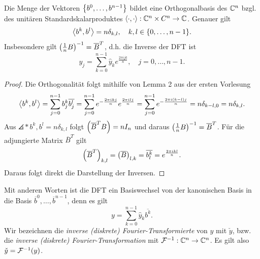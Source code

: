 \documentclass{lecture}
\begin{document}
    \begin{theorem}
        Die Menge der Vektoren \(\braces*{b^0, \ldots, b^{n - 1}}\) bildet eine Orthogonalbasis des \(\C^n\) bzgl. des unitären Standardskalarproduktes \(\angles*{\cdot, \cdot}: \C^n \times C^n \to \C\).
        Genauer gilt
        \[
            \angles*{b^k, b^l} = n\delta_{k, l}, \quad k, l \in \braces*{0, \ldots, n - 1}.
        \]
        Insbesondere gilt \(\parentheses*{\frac{1}{n}B}^{-1} = \overline{B}^T\), d.h. die Inverse der DFT ist
        \[
            y_j = \sum_{k = 0}^{n - 1}\hat{y}_k e^{\frac{2\pi ijk}{n}}, \quad j = 0, \ldots, n - 1.
        \]
    \end{theorem}

    \begin{proof}
        Die Orthogonalität folgt mithilfe von Lemma 2 aus der ersten Vorlesung
        \[
            \angles*{b^k, b^l} = \sum_{j = 0}^{n - 1}b_j^k \overline{b_j^l} = \sum_{j = 0}^{n - 1}e^{-\frac{2\pi ikj}{n}}e^{\frac{2\pi ilj}{n}} = \sum_{j = 0}^{n - 1}e^{-\frac{2\pi i\parentheses*{k - l}j}{n}} = n\delta_{k - l, 0} = n\delta_{k, l}.
        \]
        Aus \(\angles*{b^k, b^l} = n\delta_{k, l}\) folgt \(\parentheses*{\overline{B}^T B} = nI_n\) und daraus \(\parentheses*{\frac{1}{n}B}^{-1} = \overline{B}^T\).
        Für die adjungierte Matrix \(\overline{B}^T\) gilt
        \[
            \parentheses*{\overline{B}^T}_{k, l} = \parentheses*{\overline{B}}_{l, k} = \overline{b_l^k} = e^{\frac{2\pi ikl}{n}}.
        \]
        Daraus folgt direkt die Darstellung der Inversen.
    \end{proof}

    \begin{remark}
        Mit anderen Worten ist die DFT ein Basiswechsel von der kanonischen Basis in die Basis \(\overline{b}^0, \ldots, \overline{b}^{n - 1}\), denn es gilt
        \[
            y = \sum_{k = 0}^{n - 1}\hat{y}_k\overline{b^k}.
        \]
        Wir bezeichnen die \emph{inverse (diskrete) Fourier-Transformierte} von \(y\) mit \(\check{y}\), bzw. die \emph{inverse (diskrete) Fourier-Transformation} mit \(\mathcal{F}^{-1}: \C^n \to \C^n\).
        Es gilt also \(\check{y} = \mathcal{F}^{-1}\parentheses*{y}\).
    \end{remark}
\end{document}
